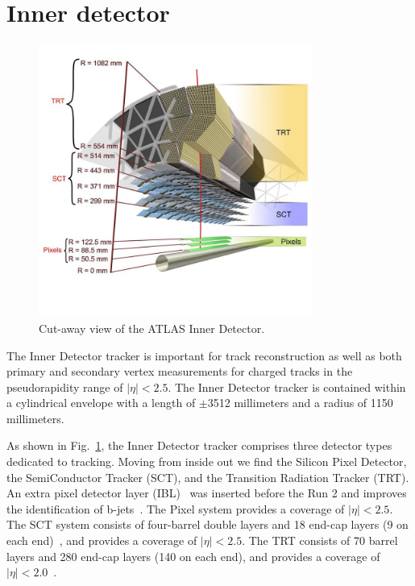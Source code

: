 \section{Inner detector}
\label{sec:inner}

\begin{figure}[htbp]
    \centering
    \includegraphics[width=0.8\textwidth]{chapters/c4/figures/inner}
    \caption{Cut-away view of the ATLAS Inner Detector.}
    \label{fig:inner}
\end{figure}

\par The Inner Detector tracker is important for track reconstruction as well as both primary and secondary vertex measurements for charged tracks in the pseudorapidity range of $|\eta| < 2.5$. The Inner Detector tracker is contained within a cylindrical envelope with a length of $\pm$3512 millimeters and a radius of 1150 millimeters.

\par As shown in Fig.~\ref{fig:inner}, the Inner Detector tracker comprises three detector types dedicated to tracking. Moving from inside out we find the Silicon Pixel Detector, the SemiConductor Tracker (SCT), and the Transition Radiation Tracker (TRT). An extra pixel detector layer (IBL)~\cite{Capeans:1291633} was inserted before the Run 2 and improves the identification of b-jets~\cite{ATL-PHYS-PUB-2015-022}. The Pixel system provides a coverage of $|\eta| < 2.5$. The SCT system consists of four-barrel double layers and 18 end-cap layers (9 on each end)~\cite{Aad:2014mta}, and provides a coverage of $|\eta| < 2.5$. The TRT consists of 70 barrel layers and 280 end-cap layers (140 on each end), and provides a coverage of $|\eta| < 2.0$~\cite{Aad:2014mta}.

